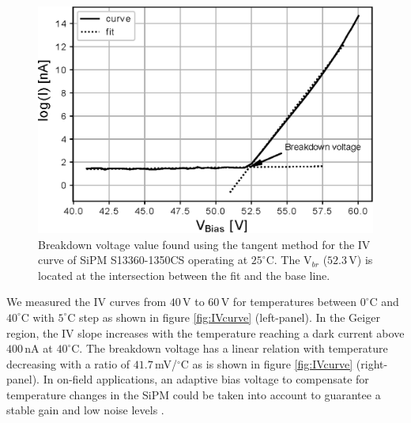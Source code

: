 \documentclass[a4paper,11pt]{article}
\begin{document}
\begin{figure}[htbp]
\centering %
\includegraphics[width=.55\textwidth]{Figures/cal_voltaje_ruptura.eps}
\caption{Breakdown voltage value found using the tangent method for the IV curve of SiPM S13360-1350CS operating at $25^{\circ}$C. The V$_{br}$ ($52.3$\,V) is located at the intersection between the fit and the base line.}
\label{fig:Vbr} 
\end{figure}

We measured the IV curves from $40$\,V to $60$\,V for temperatures between $0^{\circ}$C and $40^{\circ}$C with $5^{\circ}$C step as shown in figure  \ref{fig:IVcurve} (left-panel). In the Geiger region, the IV slope increases with the temperature reaching a dark current above $400$\,nA at $40^{\circ}$C. The breakdown voltage has a linear relation with temperature decreasing with a ratio of $41.7$\,mV/$^{\circ}$C as is shown in figure \ref{fig:IVcurve} (right-panel). In on-field applications, an adaptive bias voltage to compensate for temperature changes in the SiPM could be taken into account to guarantee a stable gain and low noise levels \cite{Eigen2019}.
\end{document}
